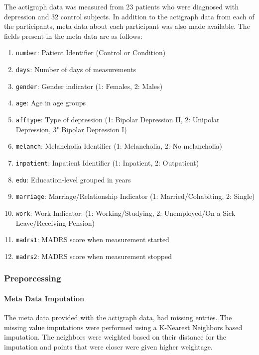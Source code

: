 \documentclass[11pt,a4paper]{article}
\newcommand{\noi}{\noindent}
\begin{document}
\noi
The actigraph data was measured from 23 patients who were diagnosed with depression and 32 control subjects. In addition to the actigraph data from each of the participants, meta data about each participant was also made available. The fields present in the meta data are as follows:
\begin{enumerate}
	\itemsep0em
	\item \texttt{number}: Patient Identifier (Control or Condition)
	\item \texttt{days}: Number of days of measurements
	\item \texttt{gender}: Gender indicator (1: Females, 2: Males)
	\item \texttt{age}: Age in age groups
	\item \texttt{afftype}: Type of depression (1: Bipolar Depression II, 2: Unipolar Depression, 3" Bipolar 
	Depression I)
	\item \texttt{melanch}: Melancholia Identifier (1: Melancholia, 2: No melancholia)
	\item \texttt{inpatient}: Inpatient Identifier (1: Inpatient, 2: Outpatient)
	\item \texttt{edu}: Education-level grouped in years
	\item \texttt{marriage}: Marriage/Relationship Indicator (1: Married/Cohabiting, 2: Single)
	\item \texttt{work}: Work Indicator: (1: Working/Studying, 2: Unemployed/On a Sick Leave/Receiving Pension)
	\item \texttt{madrs1}: MADRS score when measurement started
	\item \texttt{madrs2}: MADRS score when measurement stopped
\end{enumerate}

\subsubsection{Preporcessing}
\paragraph{Meta Data Imputation}
The meta data provided with the actigraph data, had missing entries. The missing value imputations were performed using a K-Nearest Neighbors based imputation. The neighbors were weighted based on their distance for the imputation and points that were closer were given higher weightage. 

\end{document}
